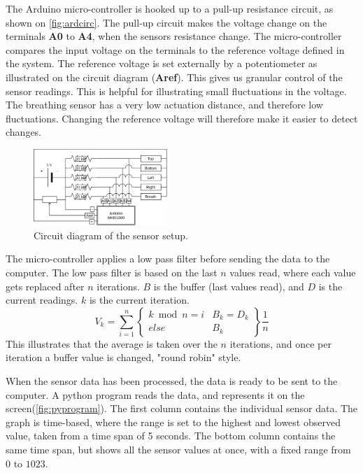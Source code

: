 \documentclass{sigchi-ext}
\begin{document}
The Arduino micro-controller is hooked up to a pull-up resistance circuit, as shown on \autoref{fig:ardcirc}. The pull-up circuit makes the voltage change on the terminals \textbf{A0} to \textbf{A4}, when the sensors resistance change. 
The micro-controller compares the input voltage on the terminals to the reference voltage defined in the system. The reference voltage is set externally by a potentiometer as illustrated on the circuit diagram (\textbf{Aref}). This gives us granular control of the sensor readings. This is helpful for illustrating small fluctuations in the voltage. The breathing sensor has a very low actuation distance, and therefore low fluctuations. Changing the reference voltage will therefore make it easier to detect changes.

\begin{figure} [H]
   \centering \includegraphics[width=0.45\textwidth]{img/arduino_diagram}
    \caption{Circuit diagram of the sensor setup.}
    \label{fig:ardcirc}
\end{figure}

The micro-controller applies a low pass filter before sending the data to the computer. The low pass filter is based on the last $n$ values read, where each value gets replaced after $n$ iterations. $B$ is the buffer (last values read), and $D$ is the current readings. $k$ is the current iteration.
$$
V_k= \sum\limits_{i=1}^n 
\left\{
\begin{array}{ll}
    k \bmod n = i & B_k = D_k\\
    else          & B_k
\end{array}\right\}\frac{1}{n}
$$
This illustrates that the average is taken over the $n$ iterations, and once per iteration a buffer value is changed, "round robin" style.

When the sensor data has been processed, the data is ready to be sent to the computer. A python program reads the data, and represents it on the screen(\autoref{fig:pyprogram}).
The first column contains the individual sensor data. The graph is time-based, where the range is set to the highest and lowest observed value, taken from a time span of 5 seconds.
The bottom column contains the same time span, but shows all the sensor values at once, with a fixed range from $0$ to $1023$.
\end{document}
